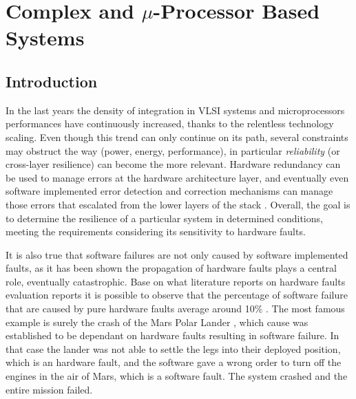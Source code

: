 \documentclass[./dissertation.tex]{subfiles}
\begin{document}
    \chapter{Complex and $\mu$-Processor Based Systems}
\section{Introduction}
\label{introduction}
In the last years the density of integration in VLSI systems and microprocessors performances have continuously increased, thanks to the relentless technology scaling. Even though this trend can only continue on its path, several constraints may obstruct the way (power, energy, performance), in particular \textit{reliability} (or cross-layer resilience) can become the more relevant. Hardware redundancy can be used to manage errors at the hardware architecture layer, and eventually even software implemented error detection and correction mechanisms can manage those errors that escalated from the lower layers of the stack \cite{7544311} \cite{6560692}. Overall, the goal is to determine the resilience of a particular system in determined conditions, meeting the requirements considering its sensitivity to hardware faults.

It is also true that software failures are not only caused by software implemented faults, as it has been shown \cite{6258310} the propagation of hardware faults plays a central role, eventually catastrophic. Base on what literature reports on hardware faults evaluation reports \cite{EBRAHIMI20141000} \cite{7604674} it is possible to observe that the percentage of software failure that are caused by pure hardware faults average around 10\% \cite{kooli:lirmm-01693156}. The most famous example is surely the crash of the Mars Polar Lander \cite{1181509}, which cause was established to be dependant on hardware faults resulting in software failure. In that case the lander was not able to settle the legs into their deployed position, which is an hardware fault, and the software gave a wrong order to turn off the engines in the air of Mars, which is a software fault. The system crashed and the entire mission failed.
\end{document}
